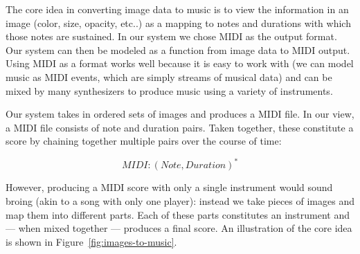 \documentclass[10pt, conference, compsocconf]{IEEEtran}
\begin{document}
The core idea in converting image data to music is to view the
information in an image (color, size, opacity, etc..) as a mapping to
notes and durations with which those notes are sustained.  In our
system we chose MIDI as the output format.  Our system can then be
modeled as a function from image data to MIDI output.  Using MIDI as a
format works well because it is easy to work with (we can model music
as MIDI events, which are simply streams of musical data) and can be
mixed by many synthesizers to produce music using a variety of
instruments.

Our system takes in ordered sets of images and produces a MIDI file.
In our view, a MIDI file consists of note and duration pairs.  Taken
together, these constitute a score by chaining together multiple pairs
over the course of time:

\[
MIDI : (Note,Duration)^{\ast}
\]

However, producing a MIDI score with only a single instrument would
sound broing (akin to a song with only one player): instead we take
pieces of images and map them into different parts.  Each of these
parts constitutes an instrument and --- when mixed together ---
produces a final score.  An illustration of the core idea is shown in
Figure~\ref{fig:images-to-music}.
\end{document}
